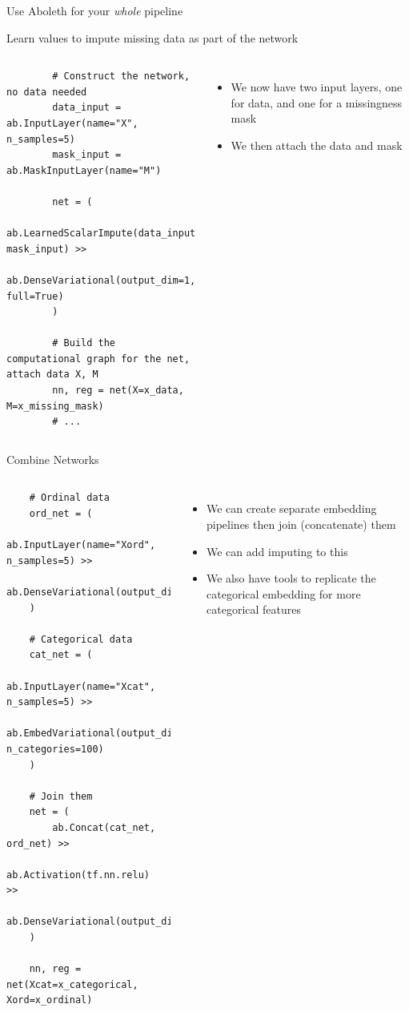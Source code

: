 \documentclass[lualatex, aspectratio=169]{beamer}
\begin{document}
\begin{frame}[fragile]{Use Aboleth for your \emph{whole} pipeline}

  Learn values to impute missing data as part of the network
  \begin{columns}
    \column{0.6\pagewidth}
    \begin{verbatim}
        # Construct the network, no data needed
        data_input = ab.InputLayer(name="X", n_samples=5)
        mask_input = ab.MaskInputLayer(name="M")

        net = (
            ab.LearnedScalarImpute(data_input, mask_input) >>
            ab.DenseVariational(output_dim=1, full=True)
        )

        # Build the computational graph for the net, attach data X, M
        nn, reg = net(X=x_data, M=x_missing_mask)
        # ...
    \end{verbatim}
    \column{0.35\pagewidth}
    \begin{itemize}
      \item We now have two input layers, one for data, and one for a missingness mask
      \item We then attach the data and mask
    \end{itemize}
  \end{columns}

\end{frame}


\begin{frame}[fragile]{Combine Networks}
  
  \begin{columns}
    \column{0.55\pagewidth}
    \begin{verbatim}
    # Ordinal data
    ord_net = (
        ab.InputLayer(name="Xord", n_samples=5) >>
        ab.DenseVariational(output_dim=10)
    )

    # Categorical data
    cat_net = (
        ab.InputLayer(name="Xcat", n_samples=5) >>
        ab.EmbedVariational(output_dim=10, n_categories=100)
    )

    # Join them
    net = (
        ab.Concat(cat_net, ord_net) >>
        ab.Activation(tf.nn.relu)  >>
        ab.DenseVariational(output_dim=1)
    )

    nn, reg = net(Xcat=x_categorical, Xord=x_ordinal)
    \end{verbatim}
    \column{0.4\pagewidth}
    \begin{itemize}
      \item We can create separate embedding pipelines then join (concatenate) them
      \item We can add imputing to this
      \item We also have tools to replicate the categorical embedding for more categorical features
    \end{itemize}
  \end{columns}
\end{frame}
\end{document}
